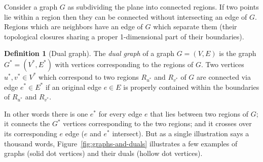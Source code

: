 \documentclass{amsart}
\theoremstyle{plain}
\theoremstyle{remark}
\theoremstyle{definition}
\newtheorem*{definition*}{Definition}
\newenvironment{definition}%
	{\begin{leftbar}\begin{definition*}
}{%
	\end{definition*}\end{leftbar}
}
\begin{document}
Consider a graph $G$ as subdividing the plane into connected regions. If two
points lie within a region then they can be connected without intersecting an
edge of $G$. Regions which are neighbors have an edge of $G$ which separate them
(their topological closures sharing a proper 1-dimensional part of their
boundaries).
\begin{definition}[Dual graph]
  The \emph{dual graph} of a graph $G=(V,E)$ is the graph $G^*=(V^*,E^*)$ with
  vertices corresponding to the regions of $G$.
  Two vertices $u^*,v^*\in V^*$
  which correspond to two regions $R_{u^*}$ and $R_{v^*}$ of $G$ are connected via edge $e^*\in
  E^*$ if an original edge $e\in E$ is properly contained within the boundaries
  of $R_{u^*}$ and $R_{v^*}$.
\end{definition}
In other words there is one $e^*$ for
every edge $e$ that lies between two regions of $G$; it connects the $G^*$
vertices corresponding to the two regions; and it crosses over its
corresponding $e$ edge ($e$ and $e^*$ intersect).
%
But as a single illustration says a thousand words,
Figure~\ref{fig:graphs-and-duals} illustrates a few examples of graphs
(solid dot vertices) and their duals (hollow dot vertices).
\end{document}
